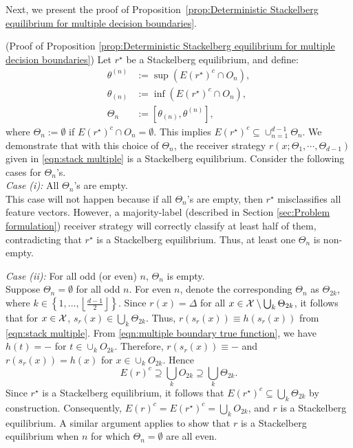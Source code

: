 Next, we present the proof of Proposition~\ref{prop:Deterministic Stackelberg equilibrium for multiple decision boundaries}.

\begin{apdxproof}(Proof of Proposition \ref{prop:Deterministic Stackelberg equilibrium for multiple decision boundaries})\label{proof:Deterministic Stackelberg equilibrium for multiple decision boundaries}
    \setcounter{claims}{0}
	Let $r^\star$ be a Stackelberg equilibrium, and define:
	\begin{equation*}
		\begin{aligned}
			\theta^{(n)} &:= \sup (E(r^\star)^c \cap O_n), \\
			\theta_{(n)} &:= \inf (E(r^\star)^c \cap O_n), \\
			\Theta_n &:= [\theta_{(n)}, \theta^{(n)}],
		\end{aligned}
	\end{equation*}
	where $\Theta_n := \emptyset$ if $E(r^\star)^c \cap O_n = \emptyset$.
	This implies $E(r^\star)^c \subseteq \cup_{n=1}^{d-1} \Theta_n$. We demonstrate that with this choice of $\Theta_n$, the receiver strategy $r(x;\Theta_1,\cdots, \Theta_{d-1})$ given in \eqref{eqn:stack multiple} is a Stackelberg equilibrium. Consider the following cases for $\Theta_n$'s. \\

	\noindent \textit{Case (i): }{All $\Theta_n$'s are empty.}\\
    This case will not happen because if all $\Theta_n$'s are empty, then $r^\star$ misclassifies all feature vectors. However, a majority-label (described in Section \ref{sec:Problem formulation}) receiver strategy will correctly classify at least half of them, contradicting that $r^\star$ is a Stackelberg equilibrium. Thus, at least one $\Theta_n$ is non-empty.

\noindent \textit{Case (ii): }{For all odd (or even) $n$, $\Theta_n$ is empty.}\\
Suppose $\Theta_n = \emptyset$ for all odd $n$. For even $n$, denote the corresponding $\Theta_n$ as $\Theta_{2k}$, where $k \in \left\{1, \dots, \left\lfloor \frac{d-1}{2} \right\rfloor \right\}$.
Since $r(x) = \Delta$ for all $x \in \mathcal{X} \setminus \bigcup_k \Theta_{2k}$, it follows that for $x \in 
 \mathcal{X}$, $s_r(x) \in \bigcup_k \Theta_{2k}$. Thus, $r(s_r(x)) \equiv h(s_r(x))$ from \eqref{eqn:stack multiple}.
From \eqref{eqn:multiple boundary true function}, we have $ h(t) = \minus$ for $t \in \cup_kO_{2k}$. Therefore, $r(s_r(x)) \equiv \minus$ and
$r(s_r(x)) = h(x)$ for $x \in \cup_kO_{2k}.$ Hence 
\[
E(r)^c \supseteq \bigcup_k O_{2k} \supseteq \bigcup_k \Theta_{2k}.
\]
Since $r^\star$ is a Stackelberg equilibrium, it follows that $E(r^\star)^c \subseteq \bigcup_k \Theta_{2k}$ by construction. Consequently, $E(r)^c = E(r^\star)^c = \bigcup_k O_{2k}$, and $r$ is a Stackelberg equilibrium.
A similar argument applies to show that $r$ is a Stackelberg equilibrium when $n$ for which $\Theta_n = \emptyset$ are all even.


\end{apdxproof}
